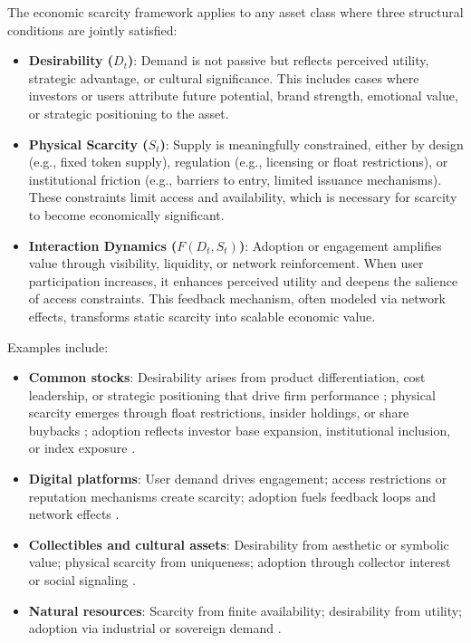 \documentclass[12pt]{article}
\begin{document}
\begin{tcolorbox}[title=\textbf{Applicability to Traditional Assets}]
The economic scarcity framework applies to any asset class where three structural conditions are jointly satisfied:

\begin{itemize}
  \item \textbf{Desirability (\( D_t \))}: Demand is not passive but reflects perceived utility, strategic advantage, or cultural significance. This includes cases where investors or users attribute future potential, brand strength, emotional value, or strategic positioning to the asset.
  
  \item \textbf{Physical Scarcity (\( S_t \))}: Supply is meaningfully constrained, either by design (e.g., fixed token supply), regulation (e.g., licensing or float restrictions), or institutional friction (e.g., barriers to entry, limited issuance mechanisms). These constraints limit access and availability, which is necessary for scarcity to become economically significant.
  
  \item \textbf{Interaction Dynamics (\( F(D_t, S_t) \))}: Adoption or engagement amplifies value through visibility, liquidity, or network reinforcement. When user participation increases, it enhances perceived utility and deepens the salience of access constraints. This feedback mechanism, often modeled via network effects, transforms static scarcity into scalable economic value.
\end{itemize}
\end{tcolorbox}

\vspace{0.5em}

Examples include:

\begin{itemize}
  \item \textbf{Common stocks}: Desirability arises from product differentiation, cost leadership, or strategic positioning that drive firm performance \citep{porter1985competitive}; physical scarcity emerges through float restrictions, insider holdings, or share buybacks \citep{pontiff2006liquidity}; adoption reflects investor base expansion, institutional inclusion, or index exposure \citep{barberis2005comovement}.

  \item \textbf{Digital platforms}: User demand drives engagement; access restrictions or reputation mechanisms create scarcity; adoption fuels feedback loops and network effects \citep{rochet2003platform, parker2016platform}.

  \item \textbf{Collectibles and cultural assets}: Desirability from aesthetic or symbolic value; physical scarcity from uniqueness; adoption through collector interest or social signaling \citep{akerlof2010identity, lin2025culture}.

  \item \textbf{Natural resources}: Scarcity from finite availability; desirability from utility; adoption via industrial or sovereign demand \citep{hotelling1931economics, kilian2009oil}.
\end{itemize}
\end{document}
